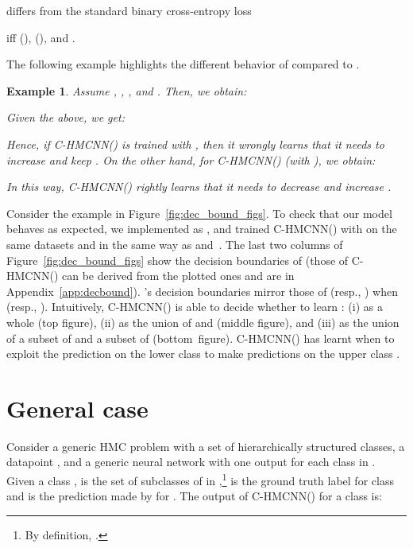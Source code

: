 \documentclass{article}
\newcommand{\loss}{\text{MCLoss}}
\newcommand{\system}[1]{C-HMCNN(#1)}
\newtheorem{example}[theorem]{Example}
\begin{document}
{\loss} differs from the standard binary cross-entropy loss

iff  (),  (), and . 



The following example highlights the different behavior of {\loss} compared to .

\begin{example}{\rm 
Assume , , , and . 
Then, we obtain: 

Given the above, we get:

Hence, if \system{} is trained with , then it wrongly learns that it needs to increase  and keep . On the other hand, for \system{} (with ), we obtain:

In this way, \system{} rightly learns that it needs to decrease  and increase .
}\end{example}








Consider the example in Figure~\ref{fig:dec_bound_figs}. To check that our model behaves as expected, we implemented  as , and trained \system{} with  on the same datasets and in the same way as  and~. 
The last two columns of Figure~\ref{fig:dec_bound_figs} show the decision boundaries of  (those of \system{} can be derived from the plotted ones and are in Appendix~\ref{app:decbound}). 
's decision boundaries mirror those of  (resp., ) when 
 (resp., ). Intuitively,
\system{} is able to decide whether to learn : (i) as a whole (top figure), (ii) as the union of  and  (middle figure), and (iii) as the union of a subset of  and a subset of  (bottom~figure). \system{} has learnt when to exploit the prediction on the lower class  to make predictions on the upper class .












\section{General case}\label{sec:main}
















Consider a generic HMC problem with a set  of  hierarchically structured classes, a datapoint , and a generic neural network  with one output for each class in . Given a class ,  is the set of subclasses of  in ,\footnote{By definition, .}  is the ground truth label for class  and  is the prediction made by  for . 
The output  of \system{} for a class  is: 
\end{document}
